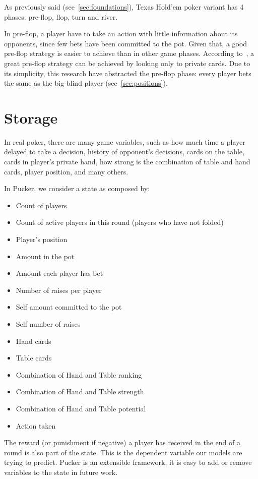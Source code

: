 As previously said (see~\ref{sec:foundations}), Texas Hold'em poker variant has 4 phases: pre-flop, flop, turn and river.

In pre-flop, a player have to take an action with little information about its opponents, since few bets have been committed to the pot. Given that, a good pre-flop strategy is easier to achieve than in other game phases. According to~\cite{someone}, a great pre-flop strategy can be achieved by looking only to private cards. Due to its simplicity, this research have abstracted the pre-flop phase: every player bets the same as the big-blind player (see~\ref{sec:positions}).

\section{Storage}
\label{sec:storage}

In real poker, there are many game variables, such as how much time a player delayed to take a decision, history of opponent’s decisions, cards on the table, cards in player’s private hand, how strong is the combination of table and hand cards, player position, and many others.

In Pucker, we consider a state as composed by:
\begin{itemize}
  \item Count of players
  \item Count of active players in this round (players who have not folded)
  \item Player's position
  \item Amount in the pot
  \item Amount each player has bet
  \item Number of raises per player
  \item Self amount committed to the pot
  \item Self number of raises
  \item Hand cards
  \item Table cards
  \item Combination of Hand and Table ranking
  \item Combination of Hand and Table strength
  \item Combination of Hand and Table potential
  \item Action taken
\end{itemize}

The reward (or punishment if negative) a player has received in the end of a round is also part of the state. This is the dependent variable our models are trying to predict. Pucker is an extensible framework, it is easy to add or remove variables to the state in future work.

